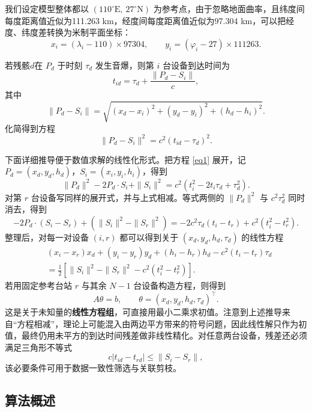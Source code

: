 \documentclass[12pt,a4paper]{article}
\begin{document}
我们设定模型整体都以 $(110^\circ\mathrm{E},\ 27^\circ\mathrm{N})$ 为参考点，由于忽略地面曲率，且纬度间每度距离值近似为111.263 km，经度间每度距离值近似为97.304 km，可以把经度、纬度差转换为米制平面坐标：
\[
x_i=(\lambda_i-110)\times 97304,\qquad
y_i=(\varphi_i-27)\times 111263.
\]

若残骸$d$在 $P_d$ 于时刻 $\tau_d$ 发生音爆，则第 $i$ 台设备到达时间为
\[
t_{id}=\tau_d+\frac{\|P_d-S_i\|}{c},
\]
其中
\[
\|P_d-S_i\|=\sqrt{(x_d-x_i)^2+(y_d-y_i)^2+(h_d-h_i)^2}.
\]
化简得到方程
\begin{equation}
\|P_d-S_i\|^2=c^2\left(t_{id}-\tau_d\right)^2.
\end{equation}\label{eq1}

下面详细推导便于数值求解的线性化形式。把方程 \eqref{eq1} 展开，记
$P_d=(x_d,y_d,h_d)$，$S_i=(x_i,y_i,h_i)$，得到
\begin{equation}
\|P_d\|^2-2P_d\cdot S_i+\|S_i\|^2
=c^2\left(t_i^2-2t_i\tau_d+\tau_d^2\right).
\end{equation}
对第 $r$ 台设备写同样的展开式，并与上式相减。等式两侧的 $\|P_d\|^2$ 与 $c^2\tau_d^2$ 同时消去，得到
\begin{equation}
-2P_d\cdot\left(S_i-S_r\right)+\left(\|S_i\|^2-\|S_r\|^2\right)
=-2c^2\tau_d\left(t_i-t_r\right)+c^2\left(t_i^2-t_r^2\right).
\end{equation}
整理后，对每一对设备 $(i,r)$ 都可以得到关于 $(x_d,y_d,h_d,\tau_d)$ 的线性方程
\begin{equation}
\begin{aligned}
&(x_i-x_r)x_d+(y_i-y_r)y_d+(h_i-h_r)h_d-c^2(t_i-t_r)\tau_d\\
&=\frac12\left[\|S_i\|^2-\|S_r\|^2-c^2\left(t_i^2-t_r^2\right)\right].
\end{aligned}
\end{equation}
若用固定参考台站 $r$ 与其余 $N-1$ 台设备构造方程，则得到
\begin{equation}
A\theta=b,\qquad \theta=(x_d,y_d,h_d,\tau_d)^\top.
\end{equation}
这是关于未知量的\textbf{线性方程组}，可直接用最小二乘求初值。注意到上述推导来自“方程相减”，理论上可能混入由两边平方带来的符号问题，因此线性解只作为初值，最终仍用未平方的到达时间残差做非线性精化。对任意两台设备，残差还必须满足三角形不等式
\[
c|t_{id}-t_{rd}|\le\|S_i-S_r\|,
\]
该必要条件可用于数据一致性筛选与关联剪枝。

\subsection{算法概述}
\end{document}
